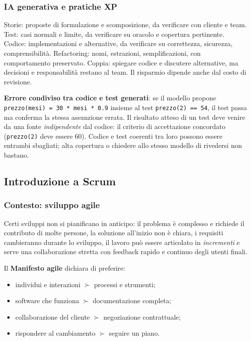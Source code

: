 \documentclass[a4paper,12pt]{article}
\begin{document}
\subsubsection{IA generativa e pratiche XP}
Storie: proposte di formulazione e scomposizione, da verificare con cliente e team. Test:
casi normali e limite, da verificare su oracolo e copertura pertinente. Codice:
implementazioni e alternative, da verificare su correttezza, sicurezza, comprensibilità.
Refactoring: nomi, estrazioni, semplificazioni, con comportamento preservato. Coppia:
spiegare codice e discutere alternative, ma decisioni e responsabilità restano al team.
Il risparmio dipende anche dal costo di revisione.

\textbf{Errore condiviso tra codice e test generati}: se il modello propone
\texttt{prezzo(mesi) = 30 * mesi * 0.9} insieme al test \texttt{prezzo(2) == 54}, il test
passa ma conferma la stessa assunzione errata. Il risultato atteso di un test deve venire da
una fonte \emph{indipendente} dal codice: il criterio di accettazione concordato
(\texttt{prezzo(2)} deve essere 60). Codice e test coerenti tra loro possono essere entrambi
sbagliati; alta copertura o chiedere allo stesso modello di rivedersi non bastano.

\subsection{Introduzione a Scrum}

\subsubsection{Contesto: sviluppo agile}
Certi sviluppi non si pianificano in anticipo: il problema è complesso e richiede il
contributo di molte persone, la soluzione all'inizio non è chiara, i requisiti
cambieranno durante lo sviluppo, il lavoro può essere articolato in \emph{incrementi} e
serve una collaborazione stretta con feedback rapido e continuo degli utenti finali.

Il \textbf{Manifesto agile} dichiara di preferire:
\begin{itemize}
  \item individui e interazioni $\succ$ processi e strumenti;
  \item software che funziona $\succ$ documentazione completa;
  \item collaborazione del cliente $\succ$ negoziazione contrattuale;
  \item rispondere al cambiamento $\succ$ seguire un piano.
\end{itemize}
\end{document}
